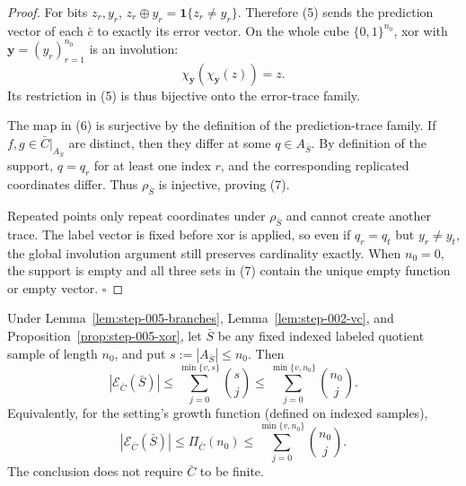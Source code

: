 \begin{proof}
For bits \(z_r,y_r\),
\(z_r\oplus y_r=\mathbf 1\{z_r\ne y_r\}\).  Therefore (5) sends the
prediction vector of each \(\bar c\) to exactly its error vector.  On the
whole cube \(\{0,1\}^{n_0}\), xor with \(\mathbf y=(y_r)_{r=1}^{n_0}\) is
an involution:
\[
\chi_{\mathbf y}(\chi_{\mathbf y}(z))=z.
\]
Its restriction in (5) is thus bijective onto the error-trace family.

The map in (6) is surjective by the definition of the prediction-trace
family.  If \(f,g\in\bar C|_{A_{\bar S}}\) are distinct, then they differ at
some \(q\in A_{\bar S}\).  By definition of the support, \(q=q_r\) for at
least one index \(r\), and the corresponding replicated coordinates differ.
Thus \(\rho_{\bar S}\) is injective, proving (7).

Repeated points only repeat coordinates under \(\rho_{\bar S}\) and cannot
create another trace.  The label vector is fixed before xor is applied, so
even if \(q_r=q_t\) but \(y_r\ne y_t\), the global involution argument still
preserves cardinality exactly.  When \(n_0=0\), the support is empty and all
three sets in (7) contain the unique empty function or empty vector.
\(\square\)


\end{proof}

\begin{lemma}\label{lem:step-005-sauer}
Under Lemma~\ref{lem:step-005-branches}, Lemma~\ref{lem:step-002-vc}, and
Proposition~\ref{prop:step-005-xor}, let \(\bar S\) be any fixed indexed
labeled quotient sample of length \(n_0\), and put
\(s:=|A_{\bar S}|\le n_0\).  Then
\[
|\mathcal E_{\bar C}(\bar S)|
\le \sum_{j=0}^{\min\{v,s\}}\binom{s}{j}
\le \sum_{j=0}^{\min\{v,n_0\}}\binom{n_0}{j}.
\tag{8}
\]
Equivalently, for the setting's growth function (defined on indexed
samples),
\[
|\mathcal E_{\bar C}(\bar S)|
\le \Pi_{\bar C}(n_0)
\le \sum_{j=0}^{\min\{v,n_0\}}\binom{n_0}{j}.
\tag{9}
\]
The conclusion does not require \(\bar C\) to be finite.


\end{lemma}

